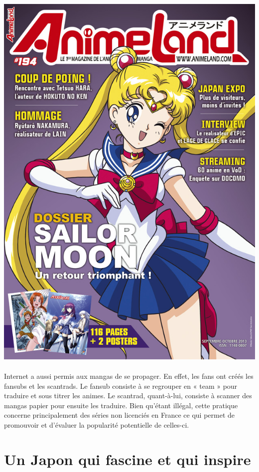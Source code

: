 \begin{center}
	\includegraphics[scale=0.8]{animeland.jpg}
\end{center}

\paragraph{} Internet a aussi permis aux mangas de se propager. En effet, les
fans ont créés les fansubs et les scantrads. Le fansub consiste à se regrouper
en « team » pour traduire et sous titrer les animes. Le scantrad, quant-à-lui,
consiste à scanner des mangas papier pour ensuite les traduire. Bien qu’étant
illégal, cette pratique concerne principalement des séries non licenciés en
France ce qui permet de promouvoir et d’évaluer la popularité potentielle de
celles-ci.

\section{Un Japon qui fascine et qui inspire}

